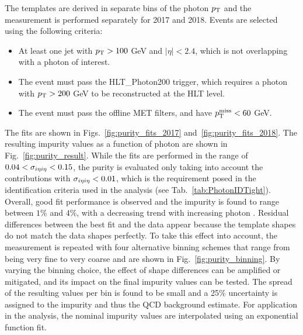 The templates are derived in separate bins of the photon $p_{\textrm{T}}$ and the measurement is performed separately for 2017 and 2018. 
Events are selected using the following criteria:

\begin{itemize}
    \item At least one jet with $p_{\textrm{T}}>100$ GeV and $|\eta|<2.4$, which is not overlapping with a photon of interest.
    \item The event must pass the HLT\_Photon200 trigger, which requires a photon with $p_{\textrm{T}} > 200$ GeV to be reconstructed at the HLT level.
    \item The event must pass the offline MET filters, and have $p_{\textrm{T}}^{\textrm{miss}} < 60$ GeV.
\end{itemize}

The fits are shown in Figs.~\ref{fig:purity_fits_2017} and~\ref{fig:purity_fits_2018}. The resulting impurity values as a function of photon \pt 
are shown in Fig.~\ref{fig:purity_result}. While the fits are performed in the range of $0.04<\sigma_{i\eta i\eta}<0.15$, the purity is evaluated only taking 
into account the contributions with $\sigma_{i\eta i\eta}<0.01$, which is the requirement posed in the identification criteria used in the analysis (see Tab.~\ref{tab:PhotonIDTight}).  
Overall, good fit performance is observed and the impurity is found to range between $1\%$ and $4\%$, with a decreasing trend with increasing photon \pt. 
Residual differences between the best fit and the data appear because the template shapes do not match the data shapes perfectly. To take this 
effect into account, the measurement is repeated with four alternative binning schemes that range from being very fine to very coarse and are shown in 
Fig.~\ref{fig:purity_binning}. By varying the binning choice, the effect of shape differences can be amplified or mitigated, and its impact on the 
final impurity values can be tested. The spread of the resulting values per bin is found to be small and a 25\% uncertainty is assigned to the impurity 
and thus the QCD background estimate. For application in the analysis, the nominal impurity values are interpolated using an exponential function fit.

